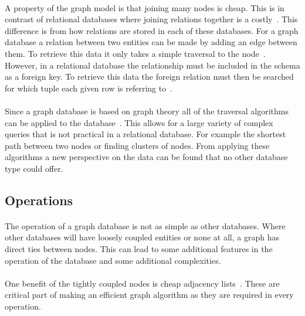 \documentclass{CRPITStyle}
\renewcommand{\cite}{\citep}
\begin{document}
\paragraph{}
A property of the graph model is that joining many nodes is cheap.
This is in contrast of relational databases where joining relations
together is a costly~\cite{relational_db}.
This difference is from how relations are stored in each of these
databases.
For a graph database a relation between two entities can be made
by adding an edge between them.
To retrieve this data it only takes a simple traversal to the
node~\cite{neo4j}.
However, in a relational database the relationship must be included
in the schema as a foreign key.
To retrieve this data the foreign relation must then be searched for
which tuple each given row is referring to~\cite{relational_db}.

\paragraph{}
Since a graph database is based on graph theory all of the
traversal algorithms can be applied to the database~\cite{sql_nosql}.
This allows for a large variety of complex queries that is
not practical in a relational database.
For example the shortest path between two nodes or finding
clusters of nodes.
From applying these algorithms a new perspective on the data can
be found that no other database type could offer.

\subsection{Operations}

\paragraph{}
The operation of a graph database is not as simple as
other databases.
Where other databases will have loosely coupled entities
or none at all, a graph has direct ties between nodes.
This can lead to some additional features in the operation
of the database and some additional complexities.

\paragraph{}
One benefit of the tightly coupled nodes is cheap
adjacency lists~\cite{type_nosql}.
These are critical part of making an efficient graph
algorithm as they are required in every operation.
\end{document}
